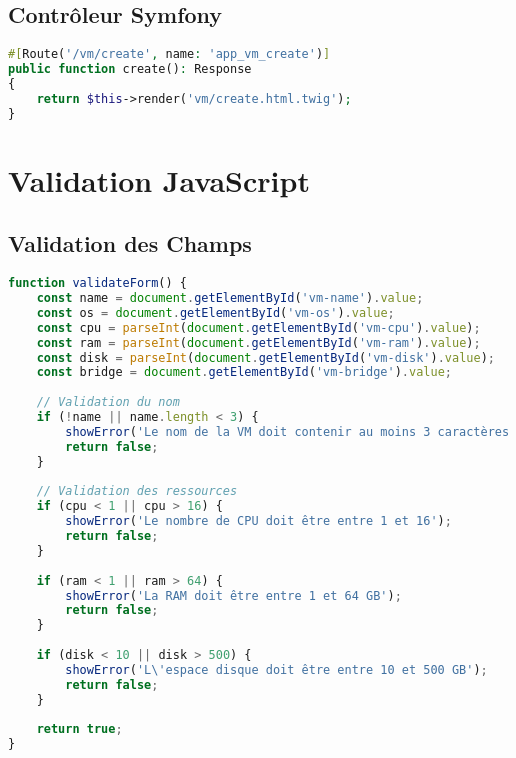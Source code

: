 \documentclass[12pt,a4paper]{report}
\begin{document}
\subsection{Contrôleur Symfony}

\begin{lstlisting}[language=PHP, caption=Route de création de VM]
#[Route('/vm/create', name: 'app_vm_create')]
public function create(): Response
{
    return $this->render('vm/create.html.twig');
}
\end{lstlisting}

\section{Validation JavaScript}

\subsection{Validation des Champs}

\begin{lstlisting}[language=JavaScript, caption=Validation du formulaire]
function validateForm() {
    const name = document.getElementById('vm-name').value;
    const os = document.getElementById('vm-os').value;
    const cpu = parseInt(document.getElementById('vm-cpu').value);
    const ram = parseInt(document.getElementById('vm-ram').value);
    const disk = parseInt(document.getElementById('vm-disk').value);
    const bridge = document.getElementById('vm-bridge').value;
    
    // Validation du nom
    if (!name || name.length < 3) {
        showError('Le nom de la VM doit contenir au moins 3 caractères');
        return false;
    }
    
    // Validation des ressources
    if (cpu < 1 || cpu > 16) {
        showError('Le nombre de CPU doit être entre 1 et 16');
        return false;
    }
    
    if (ram < 1 || ram > 64) {
        showError('La RAM doit être entre 1 et 64 GB');
        return false;
    }
    
    if (disk < 10 || disk > 500) {
        showError('L\'espace disque doit être entre 10 et 500 GB');
        return false;
    }
    
    return true;
}
\end{lstlisting}

\end{document}
